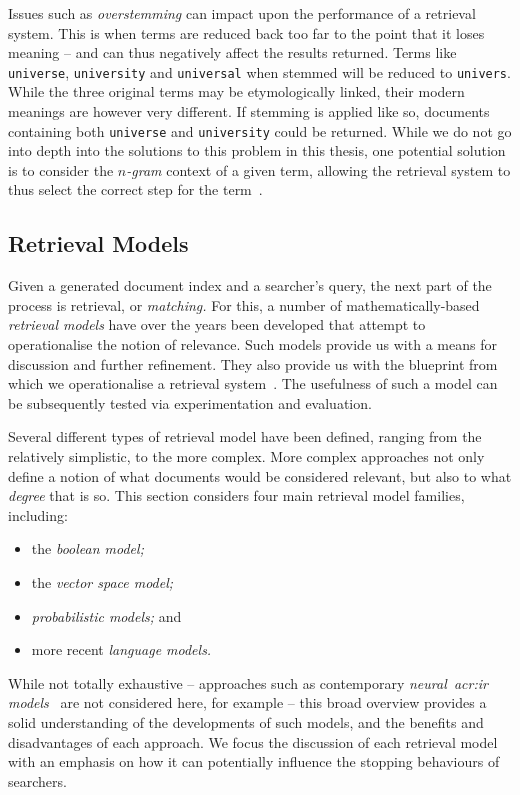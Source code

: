 Issues such as \emph{overstemming} can impact upon the performance of a retrieval system. This is when terms are reduced back too far to the point that it loses meaning -- and can thus negatively affect the results returned. Terms like \texttt{universe}, \texttt{university} and \texttt{universal} when stemmed will be reduced to \texttt{univers}. While the three original terms may be etymologically linked, their modern meanings are however very different. If stemming is applied like so, documents containing both \texttt{universe} and \texttt{university} could be returned. While we do not go into depth into the solutions to this problem in this thesis, one potential solution is to consider the \emph{$n$-gram} context of a given term, allowing the retrieval system to thus select the correct step for the term~\citep{mcnamee2005stemminggrams}.

\subsection{Retrieval Models}\label{sec:ir_background:basics:models}
Given a generated document index and a searcher's query, the next part of the process is retrieval, or \emph{matching.} For this, a number of mathematically-based \emph{retrieval models} have over the years been developed that attempt to operationalise the notion of relevance. Such models provide us with a means for discussion and further refinement. They also provide us with the blueprint from which we operationalise a retrieval system~\citep{hiemstra2009ir_models}. The usefulness of such a model can be subsequently tested via experimentation and evaluation.

Several different types of retrieval model have been defined, ranging from the relatively simplistic, to the more complex. More complex approaches not only define a notion of what documents would be considered relevant, but also to what \emph{degree} that is so. This section considers four main retrieval model families, including:

\begin{itemize}
    \item{the \emph{boolean model;}}
    \item{the \emph{vector space model;}}
    \item{\emph{probabilistic models;} and}
    \item{more recent \emph{language models.}}
\end{itemize}

While not totally exhaustive -- approaches such as contemporary \emph{neural~\gls{acr:ir} models}~\citep{mitra2017neural_ir} are not considered here, for example -- this broad overview provides a solid understanding of the developments of such models, and the benefits and disadvantages of each approach. We focus the discussion of each retrieval model with an emphasis on how it can potentially influence the stopping behaviours of searchers.

